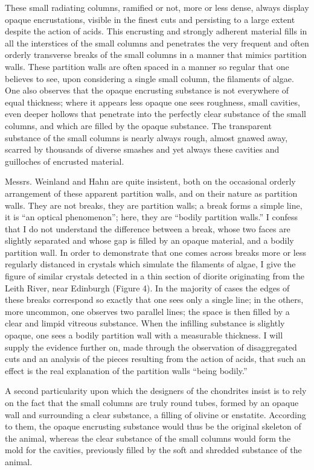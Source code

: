 \documentclass[a4paper, 12pt, oneside]{article}
\begin{document}
These small radiating columns, ramified or not, more or less dense, always display opaque encrustations, visible in the finest cuts and persisting to a large extent despite the action of acids. This encrusting and strongly adherent material fills in all the interstices of the small columns and penetrates the very frequent and often orderly transverse breaks of the small columns in a manner that mimics partition walls. These partition walls are often spaced in a manner so regular that one believes to see, upon considering a single small column, the filaments of algae. One also observes that the opaque encrusting substance is not everywhere of equal thickness; where it appears less opaque one sees roughness, small cavities, even deeper hollows that penetrate into the perfectly clear substance of the small columns, and which are filled by the opaque substance. The transparent substance of the small columns is nearly always rough, almost gnawed away, scarred by thousands of diverse smashes and yet always these cavities and guilloches of encrusted material.

Messrs. Weinland and Hahn are quite insistent, both on the occasional orderly arrangement of these apparent partition walls, and on their nature as partition walls. They are not breaks, they are partition walls; a break forms a simple line, it is ``an optical phenomenon''; here, they are ``bodily partition walls.'' I confess that I do not understand the difference between a break, whose two faces are slightly separated and whose gap is filled by an opaque material, and a bodily partition wall. In order to demonstrate that one comes across breaks more or less regularly distanced in crystals which simulate the filaments of algae, I give the figure of similar crystals detected in a thin section of diorite originating from the Leith River, near Edinburgh (Figure 4). In the majority of cases the edges of these breaks correspond so exactly that one sees only a single line; in the others, more uncommon, one observes two parallel lines; the space is then filled by a clear and limpid vitreous substance. When the infilling substance is slightly opaque, one sees a bodily partition wall with a measurable thickness. I will supply the evidence further on, made through the observation of disaggregated cuts and an analysis of the pieces resulting from the action of acids, that such an effect is the real explanation of the partition walls ``being bodily.''

A second particularity upon which the designers of the chondrites insist is to rely on the fact that the small columns are truly round tubes, formed by an opaque wall and surrounding a clear substance, a filling of olivine or enstatite. According to them, the opaque encrusting substance would thus be the original skeleton of the animal, whereas the clear substance of the small columns would form the mold for the cavities, previously filled by the soft and shredded substance of the animal.
\end{document}
